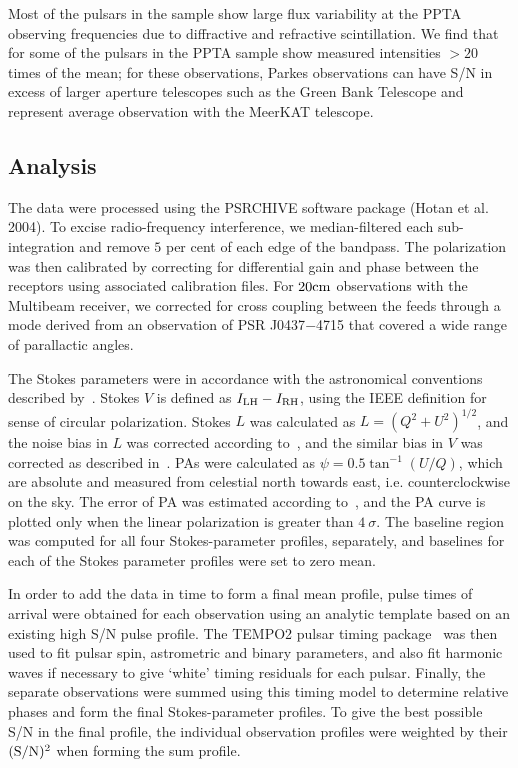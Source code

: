 \documentclass[useAMS,usenatbib]{mn2e}
\begin{document}
Most of the pulsars in the sample show large flux variability at the PPTA 
observing frequencies due to diffractive and refractive scintillation. 
We find that for some of the pulsars in the PPTA sample show measured intensities 
$> 20$ times of the mean; for these observations, Parkes observations can have S/N 
in excess of larger aperture telescopes such as the Green Bank Telescope and 
represent average observation with the MeerKAT telescope.
%


\subsection{Analysis}

The data were processed using the PSRCHIVE software package (Hotan et al. 2004). 
To excise radio-frequency interference, we median-filtered each sub-integration 
and remove $5$ per cent of each edge of the bandpass.
%
The polarization was then calibrated by correcting for differential gain and 
phase between the receptors using associated calibration files.
%
For $20\rm{cm}$ observations with the Multibeam receiver, we corrected for 
cross coupling between the feeds through a mode derived from an observation of 
PSR J0437$-$4715 that covered a wide range of parallactic angles.
%

The Stokes parameters were in accordance with the astronomical conventions described 
by~\citet{vanStraten10}. Stokes $V$ is defined as $I_{\rm{LH}}-I_{\rm{RH}}$, 
using the IEEE definition for sense of circular polarization. 
%
Stokes $L$ was calculated as $L=(Q^2+U^2)^{1/2}$, and the noise bias in $L$ 
was corrected according to~\citet{Lorimer05}, and the similar bias in 
$V$ was corrected as described in~\citet{Yan11}.
%
PAs were calculated as $\psi=0.5\tan^{-1}(U/Q)$, which are absolute 
and measured from celestial north towards east, i.e. counterclockwise on the sky.
%
The error of PA was estimated according to~\citet{Everett01}, and 
the PA curve is plotted only when the linear polarization is greater than 
$4\ \sigma$.
%
The baseline region was computed for all four Stokes-parameter profiles, separately, 
and baselines for each of the Stokes parameter profiles were set to zero mean.
%

In order to add the data in time to form a final mean profile, pulse times of arrival 
were obtained for each observation using an analytic template based on an existing 
high S/N pulse profile. The TEMPO2 pulsar timing package~\citep{Hobbs06}  
was then used to fit pulsar spin, astrometric and binary parameters, and also fit 
harmonic waves if necessary to give ‘white’ timing residuals for each pulsar. Finally, 
the separate observations were summed using this timing model to determine relative 
phases and form the final Stokes-parameter profiles. To give the best possible S/N 
in the final profile, the individual observation profiles were weighted by their
$(\rm{S/N})^2$ when forming the sum profile. 
\end{document}
